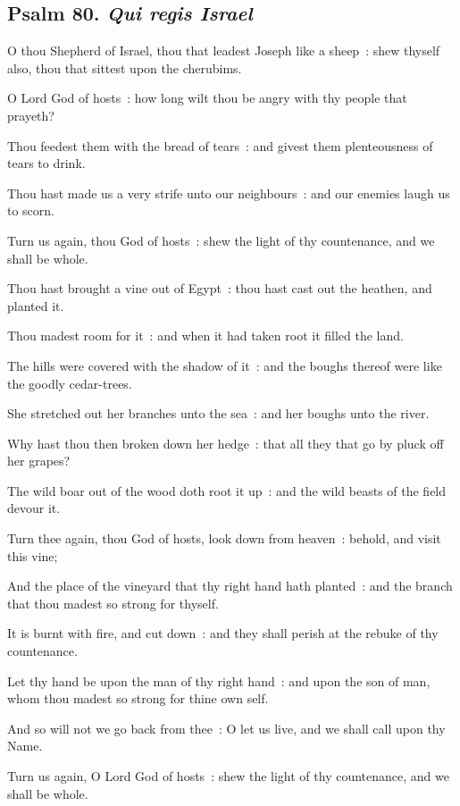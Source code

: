 \subsection{Psalm 80. \textit{Qui regis Israel}}

 O thou Shepherd of Israel, thou that leadest Joseph like a sheep~: shew thyself also, thou that sittest upon the cherubims.\par
{}
O Lord God of hosts~: how long wilt thou be angry with thy people that prayeth?\par
{}Thou feedest them with the bread of tears~: and givest them plenteousness of tears to drink.\par
{}Thou hast made us a very strife unto our neighbours~: and our enemies laugh us to scorn.\par
{}Turn us again, thou God of hosts~: shew the light of thy countenance, and we shall be whole.\par
{}Thou hast brought a vine out of Egypt~: thou hast cast out the heathen, and planted it.\par
{}Thou madest room for it~: and when it had taken root it filled the land.\par
{}The hills were covered with the shadow of it~: and the boughs thereof were like the goodly cedar-trees.\par
{}She stretched out her branches unto the sea~: and her boughs unto the river.\par
{}Why hast thou then broken down her hedge~: that all they that go by pluck off her grapes?\par
{}The wild boar out of the wood doth root it up~: and the wild beasts of the field devour it.\par
{}Turn thee again, thou God of hosts, look down from heaven~: behold, and visit this vine;\par
{}And the place of the vineyard that thy right hand hath planted~: and the branch that thou madest so strong for thyself.\par
{}It is burnt with fire, and cut down~: and they shall perish at the rebuke of thy countenance.\par
{}Let thy hand be upon the man of thy right hand~: and upon the son of man, whom thou madest so strong for thine own self.\par
{}And so will not we go back from thee~: O let us live, and we shall call upon thy Name.\par
{}Turn us again, O Lord God of hosts~: shew the light of thy countenance, and we shall be whole.\par

